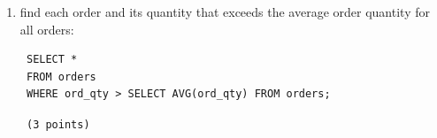 \documentclass[12pt]{article}
\begin{document}
\begin{enumerate}
\begin{enumerate}
 \begin{verbatim}
 SELECT * 
 FROM orders
 WHERE ord_paid = NULL; \end{verbatim}  	
	
	{\tt
	(2 points)
	}
	
   \item find each order and its quantity that exceeds the average order 
	quantity for all orders:
	
 \begin{verbatim}
 SELECT * 
 FROM orders
 WHERE ord_qty > SELECT AVG(ord_qty) FROM orders;\end{verbatim}  	
	{\tt
	(3 points)
	}
	
\end{enumerate}
                           



\end{enumerate}
\end{document}
